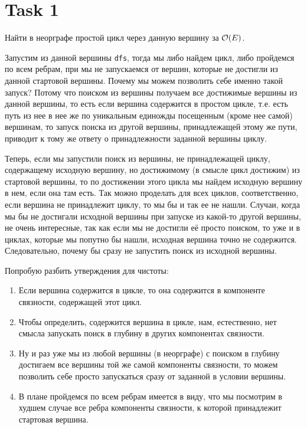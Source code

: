 \section{Task 1}
\begin{task}
    Найти в неорграфе простой цикл через данную вершину за $\mathcal{O}(E)$.
\end{task}

\begin{solution}
    Запустим из данной вершины \texttt{dfs}, тогда мы либо найдем цикл, либо пройдемся по всем ребрам, при мы не запускаемся от вершин, которые не достигли из данной стартовой вершины.
    Почему мы можем позволить себе именно такой запуск?
    Потому что поиском из вершины получаем все достижимые вершины из данной вершины, то есть если вершина содержится в простом цикле, т.е. есть путь из нее в нее же по уникальным единожды посещенным (кроме нее самой) вершинам, то запуск поиска из другой вершины, принадлежащей этому же пути, приводит к тому же ответу о принадлежности заданной вершины циклу.

    Теперь, если мы запустили поиск из вершины, не принадлежащей циклу, содержащему исходную вершину, но достижимому (в смысле цикл достижим) из стартовой вершины, то по достижении этого цикла мы найдем исходную вершину в нем, если она там есть. Так можно проделать для всех циклов, соответственно, если вершина не принадлежит циклу, то мы бы и так ее не нашли.
    Случаи, когда мы бы не достигали исходной вершины при запуске из какой-то другой вершины, не очень интересные, так как если мы не достигли её просто поиском, то уже и в циклах, которые мы попутно бы нашли, исходная вершина точно не содержится.
    Следовательно, почему бы сразу не запустить поиск из исходной вершины.
\end{solution}

\begin{upd}
    Попробую разбить утверждения для чистоты:
    \begin{enumerate}
        \item Если вершина содержится в цикле, то она содержится в компоненте связности, содержащей этот цикл.
        \item Чтобы определить, содержится вершина в цикле, нам, естественно, нет смысла запускать поиск в глубину в других компонентах связности.
        \item Ну и раз уже мы из любой вершины (в неорграфе) с поиском в глубину достигаем все вершины той же самой компоненты связности, то можем позволить себе просто запускаться сразу от заданной в условии вершины.
        \item В плане пройдемся по всем ребрам имеется в виду, что мы посмотрим в худшем случае все ребра компоненты связности, к которой принадлежит стартовая вершина.
    \end{enumerate}
\end{upd}